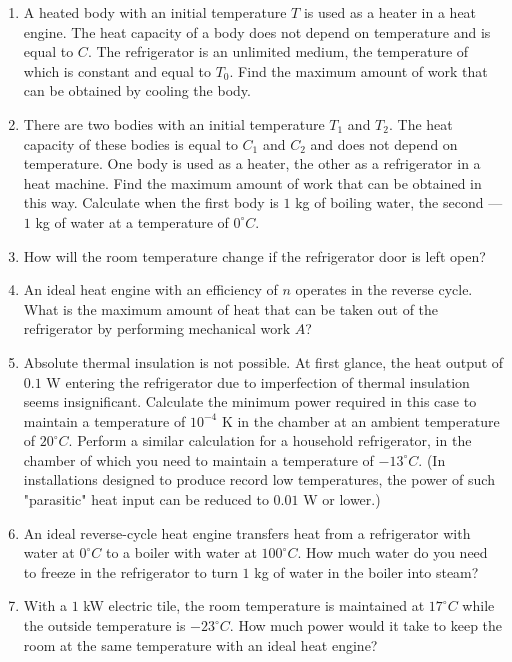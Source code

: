 \documentclass{article}
\begin{document}
\begin{enumerate}[label=5.9.\arabic*]
\item A heated body with an initial temperature $T$ is used as a heater in a heat engine. The heat capacity of a body does not depend on temperature and is equal to $C$. The refrigerator is an unlimited medium, the temperature of which is constant and equal to $T_0$. Find the maximum amount of work that can be obtained by cooling the body.

\item There are two bodies with an initial temperature $T_1$ and $T_2$. The heat capacity of these bodies is equal to $C_1$ and $C_2$ and does not depend on temperature. One body is used as a heater, the other as a refrigerator in a heat machine. Find the maximum amount of work that can be obtained in this way. Calculate when the first body is $1$ kg of boiling water, the second — $1$ kg of water at a temperature of $0^\circ C$.

\item How will the room temperature change if the refrigerator door is left open?

\item An ideal heat engine with an efficiency of $n$ operates in the reverse cycle. What is the maximum amount of heat that can be taken out of the refrigerator by performing mechanical work $A$?

\item Absolute thermal insulation is not possible. At first glance, the heat output of $0.1$ W entering the refrigerator due to imperfection of thermal insulation seems insignificant. Calculate the minimum power required in this case to maintain a temperature of $10^{-4}$ K in the chamber at an ambient temperature of $20^\circ C$. Perform a similar calculation for a household refrigerator, in the chamber of which you need to maintain a temperature of $-13^\circ C$. (In installations designed to produce record low temperatures, the power of such "parasitic" heat input can be reduced to $0.01$ W or lower.)

\item An ideal reverse-cycle heat engine transfers heat from a refrigerator with water at $0^\circ C$ to a boiler with water at $100^\circ C$. How much water do you need to freeze in the refrigerator to turn $1$ kg of water in the boiler into steam?

\item With a $1$ kW electric tile, the room temperature is maintained at $17^\circ C$ while the outside temperature is $-23^\circ C$. How much power would it take to keep the room at the same temperature with an ideal heat engine?


\end{enumerate}
\end{document}
